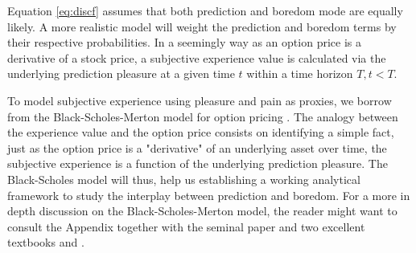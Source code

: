 \documentclass[11pt, onecolumn]{article}
\begin{document}
Equation \ref{eq:discf} assumes that both prediction and boredom mode are equally likely. A more realistic model will weight the prediction and boredom terms by their respective probabilities. 
In a seemingly way as an option price is a derivative of a stock price, a subjective experience value is calculated via the underlying prediction pleasure at a given time $t$ within a time horizon $T, t < T$. 

To model subjective experience using pleasure and pain as proxies, we borrow from the Black-Scholes-Merton model for option pricing  \citep{black_pricing_1973}. The analogy between the experience value and the option price consists on identifying a simple fact, just as the option price is a "derivative" of an underlying asset over time, the subjective experience is a function of the underlying prediction pleasure. 
The Black-Scholes model will thus, help us establishing a working analytical framework to study the interplay between prediction and boredom. For a more in depth discussion on the Black-Scholes-Merton model, the reader might want to consult the Appendix together with the seminal paper \citep{black_pricing_1973} and two excellent textbooks \citep{hull_options_2005} and \citep{duffie_dynamic_2001}.
\end{document}
